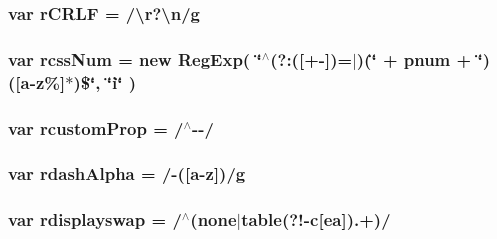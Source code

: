 \subsubsection[{\texorpdfstring{r\+C\+R\+LF}{rCRLF}}]{\setlength{\rightskip}{0pt plus 5cm}var r\+C\+R\+LF = /\textbackslash{}r?\textbackslash{}n/g}\hypertarget{jquery-3_82_81_8js_a4fd9dfc4eb645b441a3e84730c50154b}{}\label{jquery-3_82_81_8js_a4fd9dfc4eb645b441a3e84730c50154b}
\subsubsection[{\texorpdfstring{rcss\+Num}{rcssNum}}]{\setlength{\rightskip}{0pt plus 5cm}var rcss\+Num = new Reg\+Exp( \char`\"{}$^\wedge$(?\+:(\mbox{[}+-\/\mbox{]})=$\vert$)(\char`\"{} + {\bf pnum} + \char`\"{})(\mbox{[}a-\/z\%\mbox{]}$\ast$)\$\char`\"{}, \char`\"{}i\char`\"{} )}\hypertarget{jquery-3_82_81_8js_ac05a2956fc6b753a2395772e95f49028}{}\label{jquery-3_82_81_8js_ac05a2956fc6b753a2395772e95f49028}
\subsubsection[{\texorpdfstring{rcustom\+Prop}{rcustomProp}}]{\setlength{\rightskip}{0pt plus 5cm}var rcustom\+Prop = /$^\wedge$-\/-\//}\hypertarget{jquery-3_82_81_8js_a6b1af39dd6de739187a2acc21ea28d9b}{}\label{jquery-3_82_81_8js_a6b1af39dd6de739187a2acc21ea28d9b}
\subsubsection[{\texorpdfstring{rdash\+Alpha}{rdashAlpha}}]{\setlength{\rightskip}{0pt plus 5cm}var rdash\+Alpha = /-\/(\mbox{[}a-\/z\mbox{]})/g}\hypertarget{jquery-3_82_81_8js_a2d9c4c70bc32618862e2f587133cc6a6}{}\label{jquery-3_82_81_8js_a2d9c4c70bc32618862e2f587133cc6a6}
\subsubsection[{\texorpdfstring{rdisplayswap}{rdisplayswap}}]{\setlength{\rightskip}{0pt plus 5cm}var rdisplayswap = /$^\wedge$(none$\vert$table(?!-\/c\mbox{[}ea\mbox{]}).+)/}\hypertarget{jquery-3_82_81_8js_a4ec3cae64deadc15dedfb1eb7d2edfd6}{}\label{jquery-3_82_81_8js_a4ec3cae64deadc15dedfb1eb7d2edfd6}
